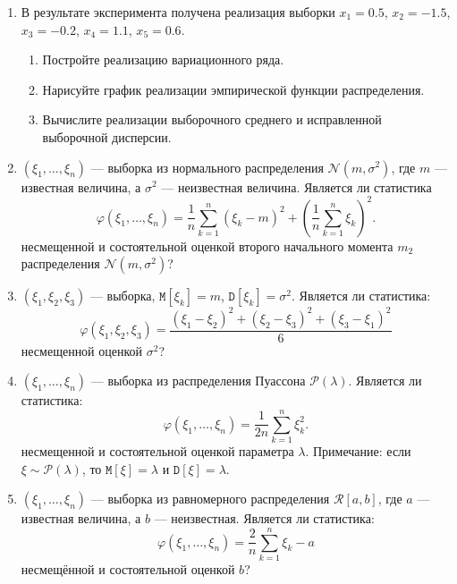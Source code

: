\documentclass[a4paper,12pt]{article}
\newcommand{\expectation}[1]{\mathtt{M} \left[ #1 \right]}
\newcommand{\variance}[1]{\mathtt{D} \left[ #1 \right]}
\begin{document}
\begin{enumerate}
    \item В результате эксперимента получена реализация выборки $x_1 = 0.5$, $x_2 = -1.5$, $x_3 = -0.2$, $x_4 = 1.1$, $x_5 = 0.6$.
          \begin{enumerate}
              \item Постройте реализацию вариационного ряда.
              \item Нарисуйте график реализации эмпирической функции распределения.
              \item Вычислите реализации выборочного среднего и исправленной выборочной дисперсии.
          \end{enumerate}

    \item $\left( \xi_1, \dots, \xi_n \right)$ --- выборка из нормального распределения $\mathcal{N}\left(m, \sigma^2 \right)$, где $m$ --- известная
          величина, а $\sigma^2$ --- неизвестная величина. Является ли статистика
          \[
              \varphi(\xi_1, \dots, \xi_n) = \frac{1}{n} \sum_{k=1}^n \left( \xi_k - m \right)^2 + \left( \frac{1}{n} \sum_{k=1}^n \xi_k \right)^2.
          \]
          несмещенной и состоятельной оценкой второго начального момента $m_2$ распределения $\mathcal{N}\left(m, \sigma^2 \right)$?

    \item $\left( \xi_1, \xi_2, \xi_3 \right)$ --- выборка, $\expectation{\xi_k} = m$, $\variance{\xi_k} = \sigma^2$. Является ли статистика:
          \[
              \varphi(\xi_1, \xi_2, \xi_3) = \frac{\left( \xi_1 - \xi_2 \right)^2 + \left( \xi_2 - \xi_3 \right)^2 + \left( \xi_3 - \xi_1 \right)^2}{6}
          \]
          несмещенной оценкой $\sigma^2$?

    \item $\left( \xi_1, \dots, \xi_n \right)$ --- выборка из распределения Пуассона $\mathcal{P}(\lambda)$. Является ли статистика:
          \[
              \varphi(\xi_1, \dots, \xi_n) = \frac{1}{2 n} \sum_{k=1}^n \xi_k^2.
          \]
          несмещенной и состоятельной оценкой параметра $\lambda$. Примечание: если $\xi \sim \mathcal{P}(\lambda)$, то $\expectation{\xi} = \lambda$
          и $\variance{\xi} = \lambda$.

    \item $\left( \xi_1, \dots, \xi_n \right)$ --- выборка из равномерного распределения $\mathcal{R}\left[a, b \right]$, где $a$ --- известная величина,
          а $b$ --- неизвестная. Является ли статистика:
          \[
              \varphi \left(\xi_1, \dots, \xi_n \right) = \frac{2}{n} \sum_{k=1}^n \xi_k - a
          \]
          несмещённой и состоятельной оценкой $b$?
\end{enumerate}
\end{document}
